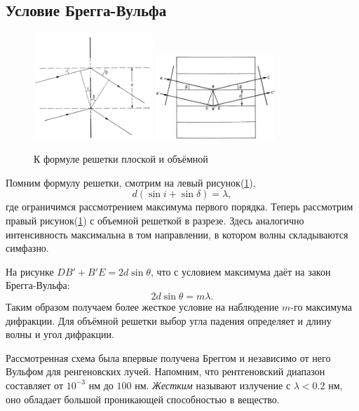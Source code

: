 \subsection{Условие Брегга-Вульфа}
\begin{figure}[ht]
    \centering
    \includegraphics[width=0.4\textwidth]{figures/10_add_reshetka.png}
    \hspace{5 mm} 
    \includegraphics[width=0.4\textwidth]{figures/10_add_bregg.png}
    \caption{К формуле решетки плоской и объёмной}
    \label{fig:10_add}
\end{figure}

Помним формулу решетки, смотрим на левый рисунок(\ref{fig:10_add}), 
\begin{equation*}{}
	d (\sin i + \sin \delta) = \lambda,
\end{equation*}
 где ограничимся рассмотрением максимума первого порядка. 
Теперь рассмотрим правый рисунок(\ref{fig:10_add}) с объемной решеткой в разрезе.
Здесь аналогично интенсивность максимальна в том направлении, в котором волны складываются симфазно.

На рисунке $DB' + B'E = 2 d \sin \theta$, что с условием максимума даёт на закон Брегга-Вульфа:
\begin{equation*}
	2 d \sin \theta = m \lambda.
\end{equation*}
Таким образом получаем более жесткое условие на наблюдение $m$-го максимума дифракции.
Для объёмной решетки выбор угла падения определяет и длину волны и угол дифракции. 

Рассмотренная схема была впервые получена Бреггом и независимо от него Вульфом для ренгеновских лучей.
Напомним, что рентгеновский диапазон составляет от $10^{-3}$ нм до $100$ нм.
\textit{Жестким}  называют излучение с $\lambda < 0.2$ нм, оно обладает большой проникающей способностью в вещество.

